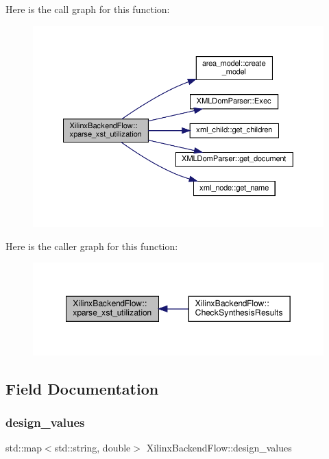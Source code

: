 Here is the call graph for this function\+:
\nopagebreak
\begin{figure}[H]
\begin{center}
\leavevmode
\includegraphics[width=350pt]{d6/d94/classXilinxBackendFlow_a396e92b4d7e3867c814afa25787a7ed6_cgraph}
\end{center}
\end{figure}
Here is the caller graph for this function\+:
\nopagebreak
\begin{figure}[H]
\begin{center}
\leavevmode
\includegraphics[width=349pt]{d6/d94/classXilinxBackendFlow_a396e92b4d7e3867c814afa25787a7ed6_icgraph}
\end{center}
\end{figure}


\subsection{Field Documentation}
\mbox{\label{classXilinxBackendFlow_a043659a1184b608b1993a05a4d61755f}} 
\subsubsection{\texorpdfstring{design\+\_\+values}{design\_values}}
{\footnotesize\ttfamily std\+::map$<$std\+::string, double$>$ Xilinx\+Backend\+Flow\+::design\+\_\+values\hspace{0.3cm}{\ttfamily [protected]}}



